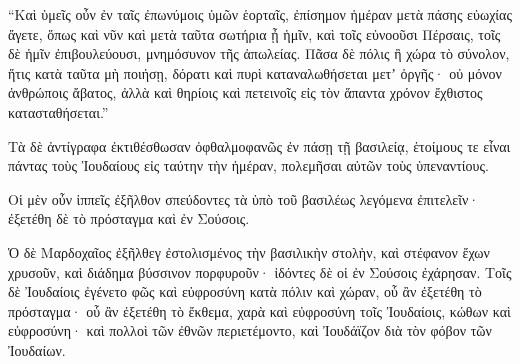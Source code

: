 {\par }{\PP {}“Καὶ ὑμεῖς οὖν ἐν ταῖς ἐπωνύμοις ὑμῶν ἑορταῖς, ἐπίσημον ἡμέραν μετὰ πάσης εὐωχίας ἄγετε, ὅπως καὶ νῦν καὶ μετὰ ταῦτα σωτήρια ᾖ ἡμῖν, καὶ τοῖς εὐνοοῦσι Πέρσαις, τοῖς δὲ ἡμῖν ἐπιβουλεύουσι, μνημόσυνον τῆς ἀπωλείας.
Πᾶσα δὲ πόλις ἢ χώρα τὸ σύνολον, ἥτις κατὰ ταῦτα μὴ ποιήσῃ, δόρατι καὶ πυρὶ καταναλωθήσεται μετʼ ὀργῆς· οὐ μόνον ἀνθρώποις ἄβατος, ἀλλὰ καὶ θηρίοις καὶ πετεινοῖς εἰς τὸν ἅπαντα χρόνον ἔχθιστος κατασταθήσεται.”
\par }{\PP {}Τὰ δὲ ἀντίγραφα ἐκτιθέσθωσαν ὀφθαλμοφανῶς ἐν πάσῃ τῇ βασιλείᾳ, ἑτοίμους τε εἶναι πάντας τοὺς Ἰουδαίους εἰς ταύτην τὴν ἡμέραν, πολεμῆσαι αὐτῶν τοὺς ὑπεναντίους.
\par }{\PP {}Οἱ μὲν οὖν ἱππεῖς ἐξῆλθον σπεύδοντες τὰ ὑπὸ τοῦ βασιλέως λεγόμενα ἐπιτελεῖν· ἐξετέθη δὲ τὸ πρόσταγμα καὶ ἐν Σούσοις.
\par }{\PP {}Ὁ δὲ Μαρδοχαῖος ἐξῆλθεγ ἐστολισμένος τὴν βασιλικὴν στολὴν, καὶ στέφανον ἔχων χρυσοῦν, καὶ διάδημα βύσσινον πορφυροῦν· ἰδόντες δὲ οἱ ἐν Σούσοις ἐχάρησαν.
Τοῖς δὲ Ἰουδαίοις ἐγένετο φῶς καὶ εὐφροσύνη
κατὰ πόλιν καὶ χώραν, οὗ ἂν ἐξετέθη τὸ πρόσταγμα· οὗ ἂν ἐξετέθη τὸ ἔκθεμα, χαρὰ καὶ εὐφροσύνη τοῖς Ἰουδαίοις, κώθων καὶ εὐφροσύνη· καὶ πολλοὶ τῶν ἐθνῶν περιετέμοντο, καὶ Ἰουδάϊζον διὰ τὸν φόβον τῶν Ἰουδαίων.

}
